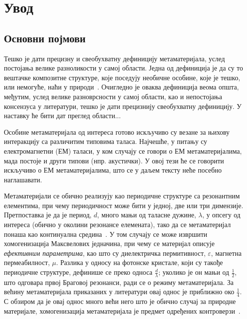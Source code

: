 \documentclass[main.tex]{subfiles}
\begin{document}
\chapter{Увод}


\section{Основни појмови}

Тешко је дати прецизну и свеобухватну дефиницију метаматеријала, услед постојања велике разноликости у самој области. Једна од дефиниција је да су то вештачке композитне структуре, које поседују необичне особине, које је тешко, или немогуће, наћи у природи~\cite{Sham:09}. Очигледно је оваква дефиниција веома општа, међутим, услед велике разноврсности у самој области, као и непостојања консензуса у литератури, тешко је дати прецизнију свеобухватну дефиницију. У наставку ће бити дат преглед области...%

Особине метаматеријала од интереса готово искључиво су везане за њихову интеракцију са различитим типовима таласа. Најчешће, у питању су електромагнетни (ЕМ) таласи, у ком случају се говори о ЕМ метаматеријалима, мада постоје и други типови (нпр. акустички). У овој тези ће се говорити искључиво о ЕМ метаматеријалима, што се у даљем тексту неће посебно наглашавати.

Метаматеријали се обично реализују као периодичне структуре са резонантним елементима, при чему периодичност може бити у једној, две или три димензије. Претпоставка је да је период, $d$, много мањи од таласне дужине, $\lambda$, у опсегу од интереса (обично у околини резонансе елемената), тако да се метаматеријал понаша као континуална средина~\cite{landau1982}. У том случају се може извршити хомогенизација Максвелових једначина, при чему се материјал описује \emph{ефективним параметрима}, као што су диелектричка пермитивност, $\varepsilon$, магнетна пермеабилност, $\mu$. Разлика у односу на фотонске кристале, који су такође периодичне структуре, дефинише се преко односа $\frac{d}{\lambda}$; уколико је он мањи од $\frac{1}{2}$, што одговара првој Браговој резонанси, ради се о режиму метаматеријала. За већину метаматеријала приказаних у литератури овај однос је приближно око $\frac{1}{4}$. С обзиром да је овај однос много већи него што је обично случај за природне материјале, хомогенизација метаматеријала је предмет одређених контроверзи~\cite{simovski}.
\end{document}
